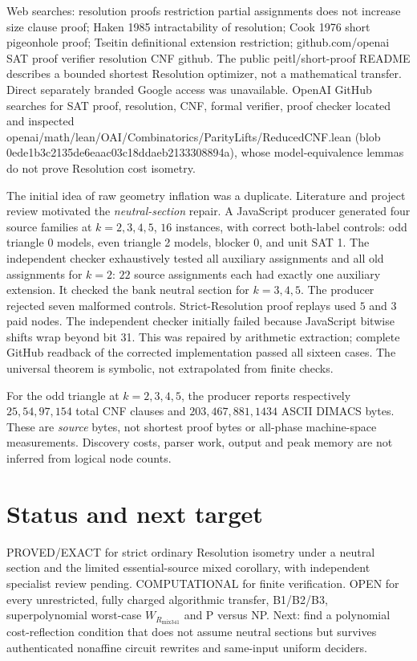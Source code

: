 \documentclass{article}
\begin{document}
Web searches: resolution proofs restriction partial assignments does not increase size clause proof; Haken 1985 intractability of resolution; Cook 1976 short pigeonhole proof; Tseitin definitional extension restriction; github.com/openai SAT proof verifier resolution CNF github. The public peitl/short-proof README describes a bounded shortest Resolution optimizer, not a mathematical transfer. Direct separately branded Google access was unavailable. OpenAI GitHub searches for SAT proof, resolution, CNF, formal verifier, proof checker located and inspected openai/math/lean/OAI/Combinatorics/ParityLifts/ReducedCNF.lean (blob 0ede1b3c2135de6eaac03c18ddaeb2133308894a), whose model-equivalence lemmas do not prove Resolution cost isometry.

The initial idea of raw geometry inflation was a duplicate. Literature and project review motivated the \emph{neutral-section} repair. A JavaScript producer generated four source families at $k=2,3,4,5$, $16$ instances, with correct both-label controls: odd triangle 0 models, even triangle 2 models, blocker 0, and unit SAT 1. The independent checker exhaustively tested all auxiliary assignments and all old assignments for $k=2$: $22$ source assignments each had exactly one auxiliary extension. It checked the bank neutral section for $k=3,4,5$. The producer rejected seven malformed controls. Strict-Resolution proof replays used $5$ and $3$ paid nodes. The independent checker initially failed because JavaScript bitwise shifts wrap beyond bit 31. This was repaired by arithmetic extraction; complete GitHub readback of the corrected implementation passed all sixteen cases. The universal theorem is symbolic, not extrapolated from finite checks.

For the odd triangle at $k=2,3,4,5$, the producer reports respectively $25,54,97,154$ total CNF clauses and $203,467,881,1434$ ASCII DIMACS bytes. These are \emph{source} bytes, not shortest proof bytes or all-phase machine-space measurements. Discovery costs, parser work, output and peak memory are not inferred from logical node counts.

\section*{Status and next target}
PROVED/EXACT for strict ordinary Resolution isometry under a neutral section and the limited essential-source mixed corollary, with independent specialist review pending. COMPUTATIONAL for finite verification. OPEN for every unrestricted, fully charged algorithmic transfer, B1/B2/B3, superpolynomial worst-case $W_{R_{\mathrm{mix341}}}$ and P versus NP. Next: find a polynomial cost-reflection condition that does not assume neutral sections but survives authenticated nonaffine circuit rewrites and same-input uniform deciders.
\end{document}
